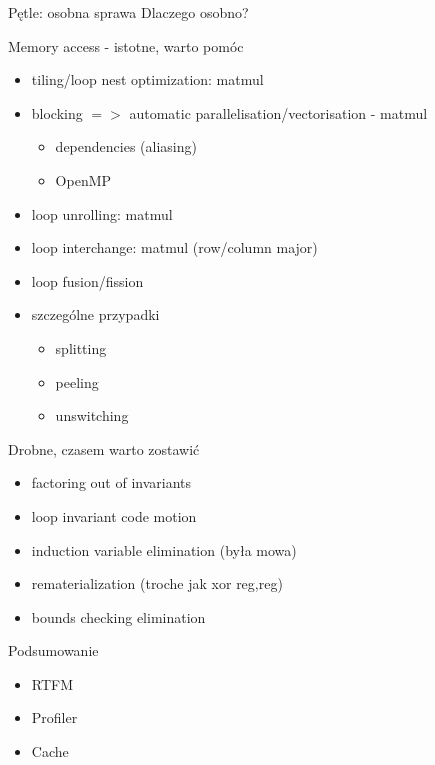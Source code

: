 \begin{frame}{Pętle: osobna sprawa}
	Dlaczego osobno?
	\begin{block}{Memory access - istotne, warto pomóc}
		\begin{itemize}
			\item tiling/loop nest optimization: matmul
			\item blocking $=>$ automatic parallelisation/vectorisation - matmul
				\begin{itemize}
					\item dependencies (aliasing)
					\item OpenMP
				\end{itemize}
			\item loop unrolling: matmul
			\item loop interchange: matmul (row/column major)
			\item loop fusion/fission
			\item szczególne przypadki
				\begin{itemize}
					\item splitting
					\item peeling
					\item unswitching
				\end{itemize}
		\end{itemize}
	\end{block}
	\begin{block}{Drobne, czasem warto zostawić}
		\begin{itemize}
			\item factoring out of invariants
			\item loop invariant code motion
			\item induction variable elimination (była mowa)
			\item rematerialization (troche jak xor reg,reg)
			\item bounds checking elimination
		\end{itemize}
	\end{block}
\end{frame}
\begin{frame}{Podsumowanie}
	\begin{itemize}
		\item RTFM
		\item Profiler
		\item Cache
	\end{itemize}
\end{frame}
